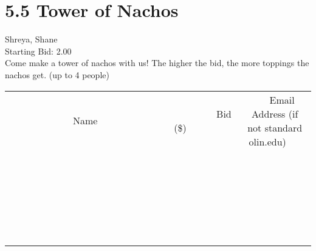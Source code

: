 \documentclass[11pt]{article}
\begin{document}
					\section*{5.5 Tower of Nachos}
					Shreya, Shane \\
					Starting Bid: 2.00 \\
					Come make a tower of nachos with us! The higher the bid, the more toppings the nachos get. (up to 4 people) \\
					[6ex]
					\begin{tabular}{c c c}
						~~~~~~~~~~~~~Name~~~~~~~~~~~~~ & ~~~~~~~~~Bid (\$)~~~~~~~~~ & ~~~Email Address (if not standard olin.edu)~~~ \\
				
 & & \\
\hline
 & & \\
\hline
 & & \\
\hline
 & & \\
\hline
 & & \\
\hline
 & & \\
\hline
 & & \\
\hline
 & & \\
\hline
 & & \\
\hline
 & & \\
\hline
 & & \\
\hline
 & & \\
\hline
 & & \\
\hline
 & & \\
\hline
 & & \\
\hline
 & & \\
\hline
 & & \\
\hline
 & & \\
\hline
 & & \\
\hline
 & & \\
\hline
 & & \\
\hline
 & & \\
\hline
 & & \\
\hline
 & & \\
\hline
 & & \\
\hline
 & & \\
\hline
					\end{tabular}
					\clearpage
				
\end{document}
